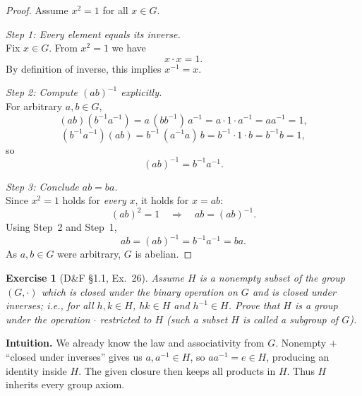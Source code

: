 \documentclass[12pt]{article}
\newtheorem{exercise}[theorem]{Exercise}
\theoremstyle{definition}
\begin{document}
\dotfill

\begin{proof}
Assume $x^2=1$ for all $x\in G$.

\dotfill

\noindent\emph{Step 1: Every element equals its inverse.}\\

\noindent
Fix $x\in G$. From $x^2=1$ we have
\[
x\cdot x=1.
\]
By definition of inverse, this implies $x^{-1}=x$.

\dotfill

\noindent\emph{Step 2: Compute $(ab)^{-1}$ explicitly.}\\

\noindent
For arbitrary $a,b\in G$,
\[
(ab)(b^{-1}a^{-1})=a\,(bb^{-1})\,a^{-1}=a\cdot 1\cdot a^{-1}=aa^{-1}=1,
\]
\[
(b^{-1}a^{-1})(ab)=b^{-1}\,(a^{-1}a)\,b=b^{-1}\cdot 1\cdot b=b^{-1}b=1,
\]
so
\[
(ab)^{-1}=b^{-1}a^{-1}.
\]

\dotfill

\noindent\emph{Step 3: Conclude $ab=ba$.}\\

\noindent
Since $x^2=1$ holds for \emph{every} $x$, it holds for $x=ab$:
\[
(ab)^2=1 \quad\Longrightarrow\quad ab=(ab)^{-1}.
\]
Using Step~2 and Step~1,
\[
ab=(ab)^{-1}=b^{-1}a^{-1}=ba.
\]
As $a,b\in G$ were arbitrary, $G$ is abelian.
\end{proof}

\newpage

\begin{exercise}[D\&F §1.1, Ex.~26]
Assume $H$ is a nonempty subset of the group $(G,\cdot)$ which is closed under the binary operation on $G$
and is closed under inverses; i.e., for all $h,k\in H$, $hk\in H$ and $h^{-1}\in H$. Prove that $H$ is a group under
the operation $\cdot$ restricted to $H$ (such a subset $H$ is called a subgroup of $G$).
\end{exercise}

\dotfill

\noindent
\textbf{Intuition.}
We already know the law and associativity from $G$. Nonempty $+$ “closed under inverses” gives us $a,a^{-1}\in H$,
so $aa^{-1}=e\in H$, producing an identity inside $H$. The given closure then keeps all products in $H$.
Thus $H$ inherits every group axiom.

\dotfill
\end{document}
